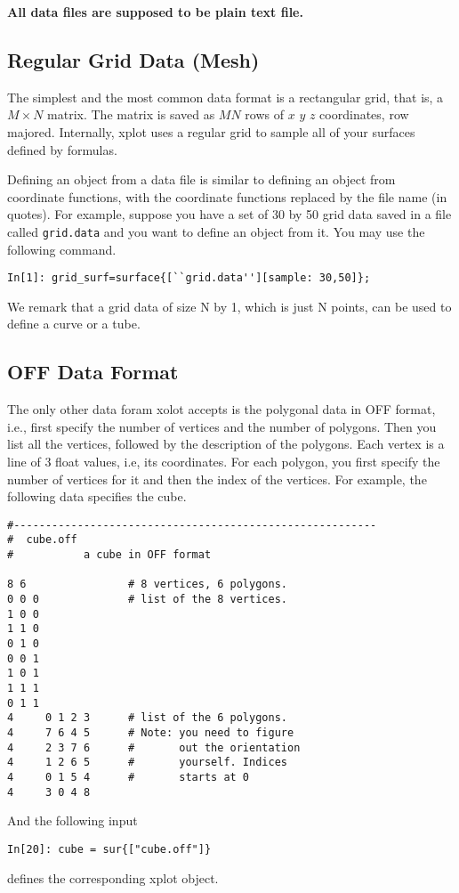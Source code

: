 \vspace{6mm}
{\bf All data files are supposed to be plain text file.}

\subsection{Regular Grid Data (Mesh)}
The simplest and the most common data format is a 
rectangular grid, that is, a $M\times N$ matrix.
The matrix is saved as $MN$ rows of $x$ $y$ $z$ 
coordinates, row majored. Internally,  { xplot} 
uses a regular grid to sample all of your surfaces
defined by formulas.
 
Defining an object from a data file is similar to
defining an object from coordinate functions, with
the coordinate functions replaced by the file name
(in quotes).
For example, suppose you have a set of 30 by 50 grid 
data saved in a file called \verb+grid.data+ and you
want to define an object from it. You may use the
following command.
\begin{verbatim}
In[1]: grid_surf=surface{[``grid.data''][sample: 30,50]};
\end{verbatim}

We remark that a grid data of size N by 1,
which is just N points, can be used to define a
curve or a tube.

\subsection{OFF Data Format}
The only other data foram xolot accepts is the polygonal data
in OFF format, i.e.,  first specify the number of
vertices and the number of polygons. Then you
list all the vertices, followed by the description
of the polygons. Each vertex is a line of 3 float
values, i.e, its coordinates. For each polygon, you
first specify the number of vertices for it and then
the index of the vertices.
For example, the following data
specifies the cube.
\begin{verbatim}
#---------------------------------------------------------
#  cube.off
#           a cube in OFF format

8 6                # 8 vertices, 6 polygons.
0 0 0              # list of the 8 vertices.
1 0 0
1 1 0
0 1 0
0 0 1
1 0 1
1 1 1
0 1 1
4     0 1 2 3      # list of the 6 polygons.
4     7 6 4 5      # Note: you need to figure
4     2 3 7 6      #       out the orientation 
4     1 2 6 5      #       yourself. Indices 
4     0 1 5 4      #       starts at 0
4     3 0 4 8
\end{verbatim}
And the following input
\begin{verbatim}
In[20]: cube = sur{["cube.off"]}
\end{verbatim}
defines the corresponding xplot object.
 

